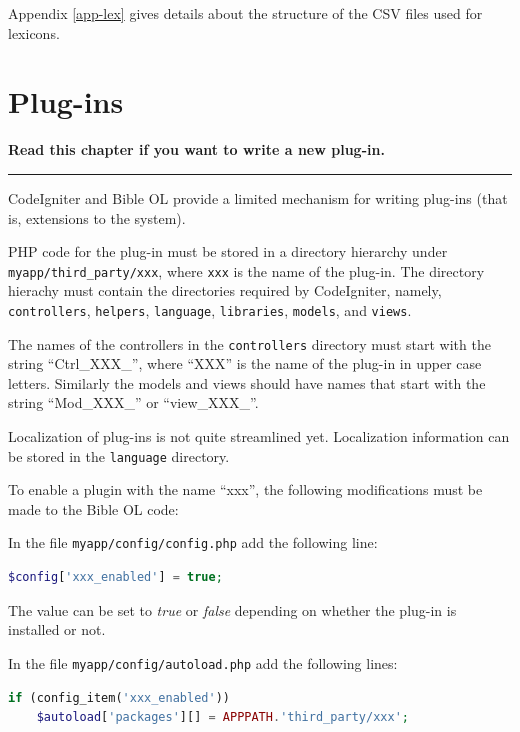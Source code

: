 \documentclass[11pt,oneside,a4paper]{memoir}
\begin{document}
Appendix \ref{app-lex} gives details about the structure of the CSV files used for lexicons.



\chapter{Plug-ins}

\textbf{Read this chapter if you want to write a new plug-in.}
\plainbreak{3}

CodeIgniter and Bible OL provide a limited mechanism for writing plug-ins (that is, extensions to
the system).

PHP code for the plug-in must be stored in a directory hierarchy under
\texttt{myapp/third\_party/xxx}, where \texttt{xxx} is the name of the plug-in. The directory
hierachy must contain the directories required by CodeIgniter, namely, \texttt{controllers},
\texttt{helpers}, \texttt{language}, \texttt{libraries}, \texttt{models}, and \texttt{views}.

The names of the controllers in the \texttt{controllers} directory must start with the string
``Ctrl\_XXX\_'', where ``XXX'' is the name of the plug-in in upper case letters. Similarly the
models and views should have names that start with the string ``Mod\_XXX\_'' or ``view\_XXX\_''.

Localization of plug-ins is not quite streamlined yet. Localization information can be stored in the
\texttt{language} directory.

To enable a plugin with the name ``xxx'', the following modifications must be made to the Bible OL
code:

In the file \texttt{myapp/config/config.php} add the following line:

\begin{lstlisting}[language=PHP]
$config['xxx_enabled'] = true;
\end{lstlisting}

The value can be set to \emph{true} or \emph{false} depending on whether the plug-in is installed or
not.

In the file \texttt{myapp/config/autoload.php} add the following lines:

\begin{lstlisting}[language=PHP]
if (config_item('xxx_enabled'))
    $autoload['packages'][] = APPPATH.'third_party/xxx';
\end{lstlisting}
\end{document}

